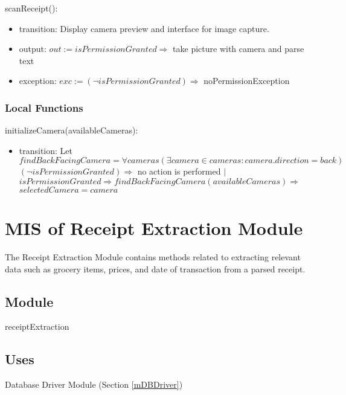 \documentclass[12pt, titlepage]{article}
\begin{document}
\noindent scanReceipt():
\begin{itemize}
  \item transition: Display camera preview and interface for image capture.
  \item output: $out := isPermissionGranted \Rightarrow$ take picture with camera and parse text
  \item exception: $exc := (\neg isPermissionGranted) \Rightarrow$ noPermissionException
\end{itemize}

\subsubsection{Local Functions}

\noindent initializeCamera(availableCameras):
\begin{itemize}
  \item transition: Let $findBackFacingCamera = \forall cameras (\exists camera \in cameras : camera.direction = back)$ \\
                    $(\neg isPermissionGranted) \Rightarrow$ no action is performed $|$\\
                    $isPermissionGranted \Rightarrow findBackFacingCamera(availableCameras) \Rightarrow $ \\
                    $selectedCamera = camera$
\end{itemize}

\newpage

\section{MIS of Receipt Extraction Module} \label{mExtraction}

The Receipt Extraction Module contains methods related to extracting relevant data such as grocery items,
prices, and date of transaction from a parsed receipt.

\subsection{Module}

receiptExtraction

\subsection{Uses}

Database Driver Module (Section \ref{mDBDriver})
\end{document}
